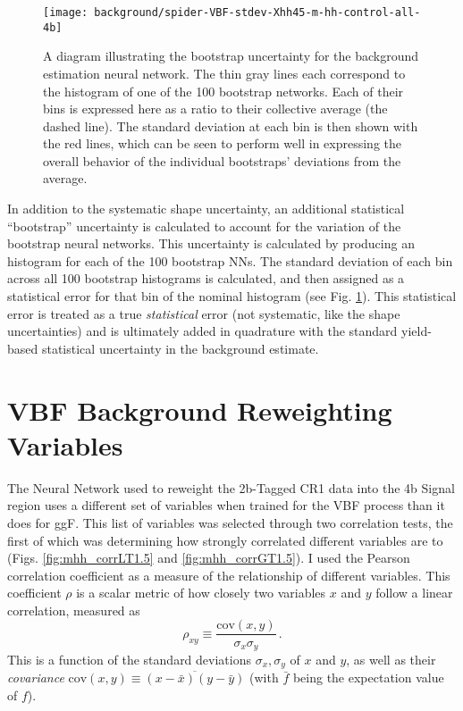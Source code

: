     \begin{figure}[tbh]
        \texttt{[image: background/spider-VBF-stdev-Xhh45-m-hh-control-all-4b]}
        \caption{
            A diagram illustrating the bootstrap uncertainty for the background estimation neural network.
            The thin gray lines each correspond to the \mhh histogram of one of the 100 bootstrap networks.
            Each of their bins is expressed here as a ratio to their collective average (the dashed line).
            The standard deviation at each bin is then shown with the red lines,
                which can be seen to perform well in expressing the overall behavior
                of the individual bootstraps' deviations from the average.
        }
        \label{fig:spider}
    \end{figure}

    In addition to the systematic shape uncertainty,
        an additional statistical ``bootstrap'' uncertainty is calculated to account for the variation of the bootstrap neural networks.
    This uncertainty is calculated by producing an \mhh histogram for each of the 100 bootstrap NNs.
    The standard deviation of each bin across all 100 bootstrap histograms is calculated,
        and then assigned as a statistical error for that bin of the nominal histogram (see Fig. \ref{fig:spider}).
    This statistical error is treated as a true \textit{statistical} error
        (not systematic, like the shape uncertainties)
        and is ultimately added in quadrature with the standard yield-based statistical uncertainty
        in the background estimate.


\FloatBarrier
\section{VBF Background Reweighting Variables} \label{sec:vbf_bgdNNRW}

    The Neural Network used to reweight the 2b-Tagged CR1 data into the 4b Signal region
        uses a different set of variables when trained for the VBF process than it does for ggF.
    This list of variables was selected through two correlation tests,
        the first of which was determining how strongly correlated different variables are to \mhh
        (Figs. \ref{fig:mhh_corrLT1.5} and \ref{fig:mhh_corrGT1.5}).
    I used the Pearson correlation coefficient as a measure of the relationship of different variables.
    This coefficient $\rho$ is a scalar metric of how closely
        two variables $x$ and $y$ follow a linear correlation, measured as
        \begin{equation}
            \rho_{xy} \equiv \frac{\textrm{cov}(x,y)}{\sigma_x \sigma_y}
            \,.
        \end{equation}
    This is a function of the standard deviations $\sigma_x,\sigma_y$ of $x$ and $y$,
        as well as their \textit{covariance} 
        $\textrm{cov}(x,y) \equiv \overline{(x-\bar{x})(y-\bar{y})}$
        (with $\bar{f}$ being the expectation value of $f$)\cite{pearson_correlation}.


